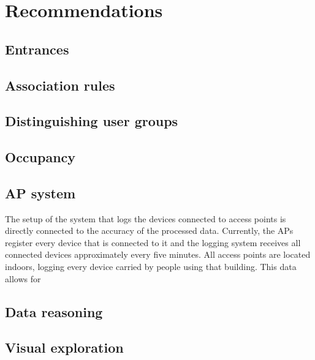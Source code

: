 \chapter{Recommendations}
\section{Entrances}

\section{Association rules} 

\section{Distinguishing user groups}

\section{Occupancy}

\section{AP system}
The setup of the system that logs the devices connected to access points is directly connected to the accuracy of the processed data. Currently, the APs register every device that is connected to it and the logging system receives all connected devices approximately every five minutes. All access points are located indoors, logging every device carried by people using that building. This data allows for 

\section{Data reasoning}

\section{Visual exploration}
